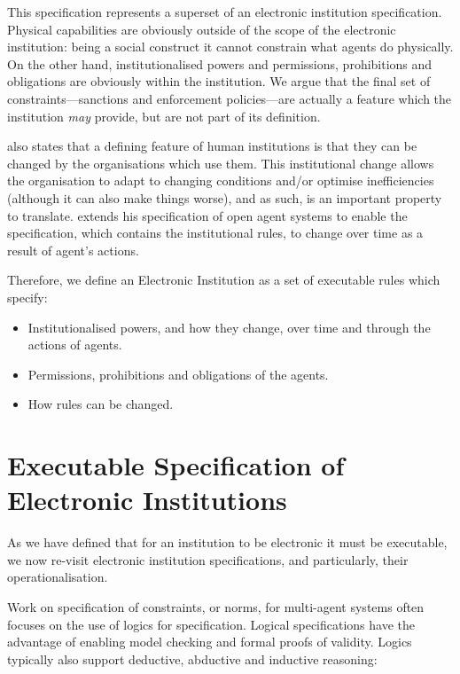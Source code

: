 This specification represents a superset of an electronic institution
specification. Physical capabilities are obviously outside of the scope of the
electronic institution: being a social construct it cannot constrain what
agents do physically. On the other hand, institutionalised powers and
permissions, prohibitions and obligations are obviously within the
institution. We argue that the final set of constraints---sanctions and
enforcement policies---are actually a feature which the institution \emph{may}
provide, but are not part of its definition.

\citet{North1990} also states that a defining feature of human institutions is
that they can be changed by the organisations which use them. This
institutional change allows the organisation to adapt to changing conditions
and/or optimise inefficiencies (although it can also make things worse), and as such,
is an important property to translate. \citet{Artikis2012a} extends his
specification of open agent systems to enable the specification, which
contains the institutional rules, to change over time as a result of agent's
actions.

Therefore, we define an Electronic Institution as a set of executable
rules which specify:

\begin{itemize}
\item Institutionalised powers, and how they change, over time
and through the actions of agents. 
\item Permissions, prohibitions and obligations of
the agents.
\item How rules can be changed.
\end{itemize}

\section{Executable Specification of Electronic Institutions}

As we have defined that for an institution to be electronic it must be
executable, we now re-visit electronic institution specifications, and
particularly, their operationalisation. 

Work on specification of constraints, or norms, for multi-agent
systems often focuses on the use of logics for specification. Logical
specifications have the advantage of enabling model checking and formal proofs
of validity. Logics typically also support deductive, abductive and inductive
reasoning:

